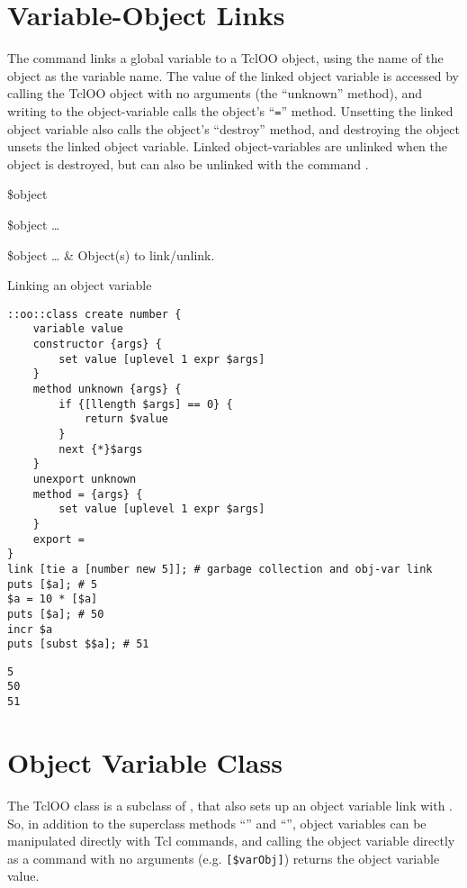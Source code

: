 \documentclass{article}
\begin{document}
\clearpage
\section{Variable-Object Links}
The command  links a global variable to a TclOO object, using the name of the object as the variable name. 
The value of the linked object variable is accessed by calling the TclOO object with no arguments (the ``unknown'' method), and writing to the object-variable calls the object's ``\texttt{=}'' method. 
Unsetting the linked object variable also calls the object's ``destroy'' method, and destroying the object unsets the linked object variable.
Linked object-variables are unlinked when the object is destroyed, but can also be unlinked with the command .
\begin{syntax}
 \$object
\end{syntax}
\begin{syntax}
 \$object …
\end{syntax}
\begin{args}
\$object … & Object(s) to link/unlink.
\end{args}
\begin{example}{Linking an object variable}
\begin{lstlisting}
::oo::class create number {
    variable value
    constructor {args} {
        set value [uplevel 1 expr $args]
    }
    method unknown {args} {
        if {[llength $args] == 0} {
            return $value
        }
        next {*}$args
    }
    unexport unknown
    method = {args} {
        set value [uplevel 1 expr $args]
    }
    export =
}
link [tie a [number new 5]]; # garbage collection and obj-var link
puts [$a]; # 5
$a = 10 * [$a]
puts [$a]; # 50
incr $a
puts [subst $$a]; # 51
\end{lstlisting}
\tcblower
\begin{lstlisting}
5
50
51
\end{lstlisting}
\end{example}
\clearpage
\section{Object Variable Class}
The TclOO class  is a subclass of , that also sets up an object variable link with . 
So, in addition to the superclass methods ``\texttt{}'' and ``\textbf{\texttt{}}'', object variables can be manipulated directly with Tcl commands, and calling the object variable directly as a command with no arguments (e.g. \texttt{[\$varObj]}) returns the object variable value.
\end{document}
